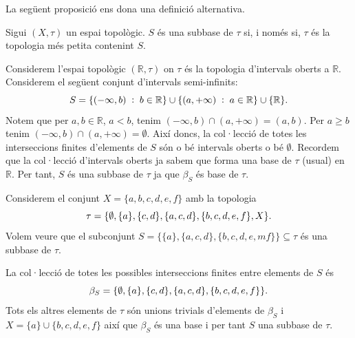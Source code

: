 \documentclass[../main.tex]{subfiles}
\begin{document}
La següent proposició ens dona una definició alternativa.

\begin{prop}
\label{prop:subbase} Sigui $(X,\tau)$ un espai topològic. $S$ és una subbase de $\tau$ si, i només si, $\tau$ és la topologia més petita contenint $S$.
\end{prop}

\begin{ej}
\label{ej:subbase1} Considerem l'espai topològic $(\mathbb{R},\tau)$ on $\tau$ és la topologia d'intervals oberts a $\mathbb{R}$. Considerem el següent conjunt d'intervals semi-infinits:
\begin{equation}
    \notag
    S = \{(-\infty,b)\;:\;b\in\mathbb{R}\}\cup\{(a,+\infty)\;:\;a\in\mathbb{R}\}\cup\{\mathbb{R}\} .
\end{equation}
Notem que per $a,b\in\mathbb{R}$, $a<b$, tenim $(-\infty,b)\cap(a,+\infty) = (a,b)$. Per $a\geq b$ tenim $(-\infty,b)\cap(a,+\infty) = \emptyset$. Així doncs, la col·lecció de totes les interseccions finites d'elements de $S$ són o bé intervals oberts o bé $\emptyset$. Recordem que la col·lecció d'intervals oberts ja sabem que forma una base de $\tau$ (usual) en $\mathbb{R}$. Per tant, $S$ és una subbase de $\tau$ ja que $\beta_S$ és base de $\tau$.
\end{ej}

\begin{ej}
\label{ej:subbase2} Considerem el conjunt $X = \{a,b,c,d,e,f\}$ amb la topologia
\begin{equation}
    \notag
    \tau = \{\emptyset,\{a\},\{c,d\},\{a,c,d\},\{b,c,d,e,f\},X\} .
\end{equation}
Volem veure que el subconjunt $S = \{\{a\},\{a,c,d\},\{b,c,d,e,mf\}\}\subseteq \tau$ és una subbase de $\tau$.

La col·lecció de totes les possibles interseccions finites entre elements de $S$ és
\begin{equation}
    \notag
    \beta_S = \{\emptyset,\{a\},\{c,d\},\{a,c,d\},\{b,c,d,e,f\}\} .
\end{equation}
Tots els altres elements de $\tau$ són unions trivials d'elements de $\beta_S$ i $X = \{a\}\cup\{b,c,d,e,f\}$ així que $\beta_S$ és una base i per tant $S$ una subbase de $\tau$.
\end{ej}
\end{document}
